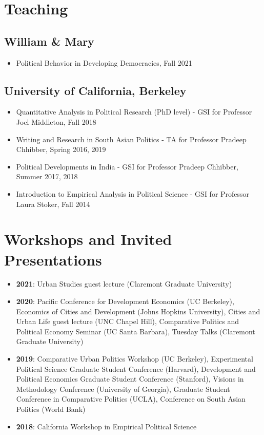 \documentclass[11pt]{article}
\begin{document}
\vspace{2mm}
\section*{Teaching}

\subsection*{William \& Mary}
\begin{itemize}[nosep]
	\item[]Political Behavior in Developing Democracies, Fall 2021
\end{itemize}
\subsection*{University of California, Berkeley}

\begin{itemize}[nosep]
	\item[]Quantitative Analysis in Political Research (PhD level) - GSI for Professor Joel Middleton, Fall 2018 
		\item[]Writing and Research in South Asian Politics - TA for Professor Pradeep Chhibber, Spring 2016, 2019
	\item[] Political Developments in India - GSI for Professor Pradeep Chhibber, Summer 2017, 2018
	\item[]Introduction to Empirical Analysis in Political Science - GSI for Professor Laura Stoker, Fall 2014	
\end{itemize}

\vspace{2mm}
\section*{Workshops and Invited Presentations}

\begin{itemize}
\item[] \textbf{2021}: Urban Studies guest lecture (Claremont Graduate University)
\item[] \textbf{2020}: Pacific Conference for Development Economics (UC Berkeley), Economics of Cities and Development (Johns Hopkins University), Cities and Urban Life guest lecture (UNC Chapel Hill), Comparative Politics and Political Economy Seminar (UC Santa Barbara), Tuesday Talks (Claremont Graduate University)
\item[] \textbf{2019}: Comparative Urban Politics Workshop (UC Berkeley), Experimental Political Science Graduate Student Conference (Harvard), Development and Political Economics Graduate Student Conference (Stanford), Visions in Methodology Conference (University of Georgia), Graduate Student Conference in Comparative Politics (UCLA), Conference on South Asian Politics (World Bank)
\item[] \textbf{2018}: California Workshop in Empirical Political Science
\end{itemize}
\end{document}
